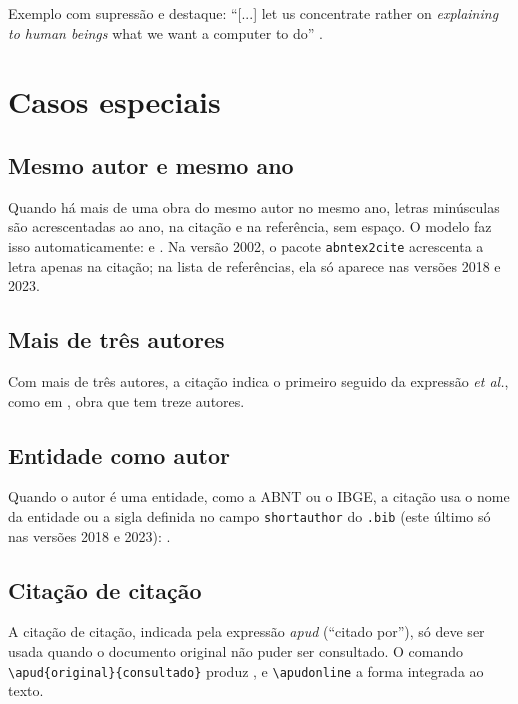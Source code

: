 \documentclass[
	12pt, %
	openright, %
	oneside, %
	a4paper, %
	sumario=tradicional, %
	english, %
	brazil, %
]{abntex2}
\begin{document}
Exemplo com supressão e destaque: ``[...] let us concentrate rather on \textit{explaining to human beings} what we want a computer to do'' \cite[p.~97, grifo nosso]{knuth1984literate}.

\section{Casos especiais}\label{sec:casos-especiais}

\subsection{Mesmo autor e mesmo ano}

Quando há mais de uma obra do mesmo autor no mesmo ano, letras minúsculas são acrescentadas ao ano, na citação e na referência, sem espaço. O modelo faz isso automaticamente: \cite{knuth1984texbook} e \cite{knuth1984literate}. Na versão 2002, o pacote \texttt{abntex2cite} acrescenta a letra apenas na citação; na lista de referências, ela só aparece nas versões 2018 e 2023.

\subsection{Mais de três autores}

Com mais de três autores, a citação indica o primeiro seguido da expressão \textit{et al.}, como em , obra que tem treze autores.

\subsection{Entidade como autor}

Quando o autor é uma entidade, como a ABNT ou o IBGE, a citação usa o nome da entidade ou a sigla definida no campo \texttt{shortauthor} do \texttt{.bib} (este último só nas versões 2018 e 2023): \cite{ibge1993}.

\subsection{Citação de citação}

A citação de citação, indicada pela expressão \textit{apud} (``citado por''), só deve ser usada quando o documento original não puder ser consultado. O comando \verb|\apud{original}{consultado}| produz , e \verb|\apudonline| a forma integrada ao texto.
\end{document}

